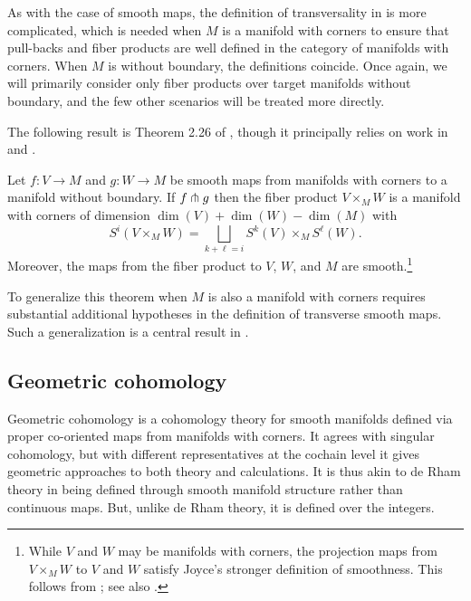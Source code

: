 As with the case of smooth maps, the definition of transversality in \cite{Joy12} is more complicated, which is needed when $M$ is a manifold with corners to ensure that pull-backs and fiber products are well defined in the category of manifolds with corners.
When $M$ is without boundary, the definitions coincide.
Once again, we will primarily consider only fiber products over target manifolds without boundary, and the few other scenarios will be treated more directly.


The following result is Theorem 2.26 of \cite{medina2022foundations}, though it principally relies on work in \cite{Joy12} and \cite{MaDo92}.

\begin{theorem}\label{pullback}
	Let $f \colon V \to M$ and $g \colon W \to M$ be smooth maps from manifolds with corners to a manifold without boundary.
	If $f \pitchfork g$ then the fiber product $V \times_M W$ is a manifold with corners of dimension $\dim(V) + \dim(W) - \dim(M)$ with
	\begin{equation*}
		S^i(V \times_M W) = \bigsqcup_{k + \ell = i} S^k(V) \times_M S^\ell(W).
	\end{equation*}
	Moreover, the maps from the fiber product to $V$, $W$, and $M$ are smooth.\footnote{While $V$ and $W$ may be manifolds with corners, the projection maps from $V \times_M W$ to $V$ and $W$ satisfy Joyce's stronger definition of smoothness.
	This follows from \cite[Theorem 6.4]{Joy12}; see also \cite[Theorem 2.26]{medina2022foundations}.}
\end{theorem}

To generalize this theorem when $M$ is also a manifold with corners requires substantial additional hypotheses in the definition of transverse smooth maps.
Such a generalization is a central result in \cite{Joy12}.

\subsection{Geometric cohomology}

Geometric cohomology is a cohomology theory for smooth manifolds defined via proper co-oriented maps from manifolds with corners.
It agrees with singular cohomology, but with different representatives at the cochain level it gives geometric approaches to both theory and calculations.
It is thus akin to de Rham theory in being defined through smooth manifold structure rather than continuous maps.
But, unlike de Rham theory, it is defined over the integers.

